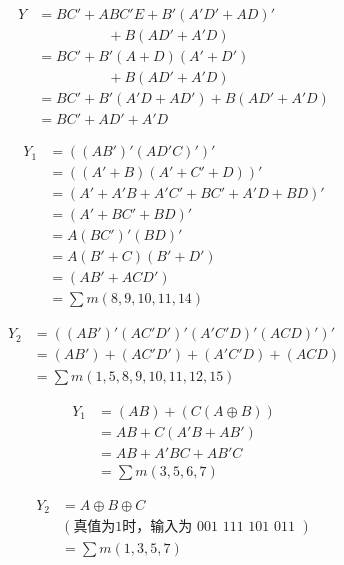 \documentclass[lang=cn,11pt,a4paper,cite=authoryear,twocolumn]{elegantpaper}
\begin{document}

\[\begin{aligned}
    Y &= BC' + ABC'E + B'(A'D'+AD)' \\
    &\quad\quad\quad\quad\quad + B(AD'+A'D) \\
    &= BC' + B'(A+D)(A'+D') \\
    &\quad\quad\quad\quad\quad + B(AD'+A'D) \\ 
    &= BC' + B'(A'D+AD') + B(AD'+A'D) \\ 
    &= BC' + AD' + A'D
\end{aligned}\]



\[\begin{aligned}
    Y_1 &= ((AB')'(AD'C)')' \\
    &= ((A'+B)(A'+C'+D))' \\
    &= (A' + A'B + A'C' +BC' +A'D +BD)'\\
    &= (A' +BC' +BD)'\\
    &= A(BC')'(BD)' \\
    &= A(B'+C)(B'+D') \\
    &= (AB' + ACD')\\
    &= \sum m(8,9,10,11,14) 
\end{aligned}\]

\[\begin{aligned}
    Y_2 &= ((AB')' (AC'D')' (A'C'D)' (ACD)')' \\
    &= (AB') + (AC'D') + (A'C'D) + (ACD) \\
    &= \sum m(1, 5, 8, 9, 10, 11, 12, 15)
\end{aligned}\]


\[\begin{aligned}
Y_1 &= (AB) + (C(A\oplus B)) \\
&= AB + C(A'B + AB') \\
&= AB + A'BC + AB'C \\ 
&= \sum m(3, 5, 6, 7)
\end{aligned}\]

\[\begin{aligned}
Y_2 &= A\oplus B\oplus C \\
&(\text{真值为1时，输入为 001 111 101 011 })\\
&= \sum m(1, 3, 5, 7)
\end{aligned}\]
\end{document}
